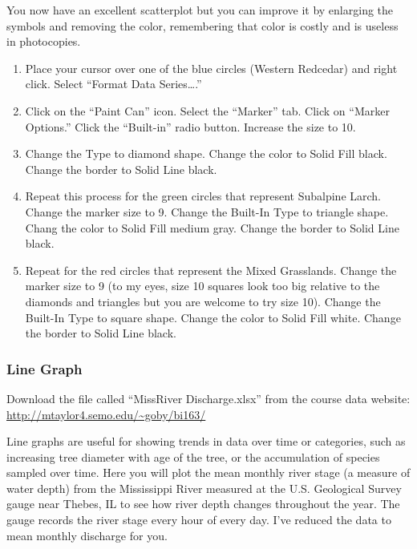\documentclass[12pt, hidelinks]{exam}
\newcommand{\VSpace}{\vspace{\baselineskip}}
\begin{document}
You now have an excellent scatterplot but you can improve it by enlarging the symbols and removing the color, remembering that color is costly and is useless in photocopies.

\begin{enumerate}[resume]
	\item Place your cursor over one of the blue circles (Western Redcedar) and right click. Select “Format Data Series….” 

	\item Click on the “Paint Can” icon. Select the “Marker” tab. Click on “Marker Options.” Click the “Built-in” radio button.  Increase the size to 10.
	
	\item Change the Type to diamond shape. Change the color to Solid Fill black. Change the border to Solid Line black.

	\item Repeat this process for the green circles that represent Subalpine Larch. Change the marker size to 9. Change the Built-In Type to triangle shape. Chang the color to Solid Fill medium gray.  Change the border to Solid Line black.

	\item Repeat for the red circles that represent the Mixed Grasslands. Change the marker size to 9 (to my eyes, size 10 squares look too big relative to the diamonds and triangles but you are welcome to try size 10). Change the Built-In Type to square shape. Change the color to Solid Fill white.  Change the border to Solid Line black.
\end{enumerate}

\subsubsection*{Line Graph}

Download the file called “MissRiver Discharge.xlsx” from the course data website: \url{http://mtaylor4.semo.edu/~goby/bi163/}\VSpace

Line graphs are useful for showing trends in data over time or categories, such as increasing tree diameter with age of the tree, or the accumulation of species sampled over time. Here you will plot the mean monthly river stage (a measure of water depth) from the Mississippi River measured at the U.S. Geological Survey gauge near Thebes, IL to see how river depth changes throughout the year. The gauge records the river stage every hour of every day. I’ve reduced the data to mean monthly discharge for you.
\end{document}
